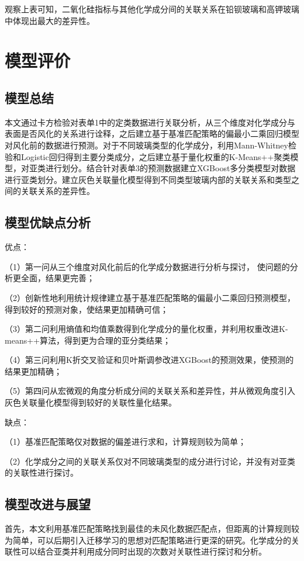\documentclass[withoutpreface,bwprint]{cumcmthesis} %
\begin{document}
观察上表可知，二氧化硅指标与其他化学成分间的关联关系在铅钡玻璃和高钾玻璃中体现出最大的差异性。

\section{模型评价}
\subsection{模型总结}

本文通过卡方检验对表单1中的定类数据进行关联分析，从三个维度对化学成分与表面是否风化的关系进行诠释，之后建立基于基准匹配策略的偏最小二乘回归模型对风化前的数据进行预测。对于不同玻璃类型的化学成分，利用Mann-Whitney检验和Logistic回归得到主要分类成分，之后建立基于量化权重的K-Means++聚类模型，对亚类进行划分。结合针对表单3的预测数据建立XGBoost多分类模型对数据进行亚类划分。建立灰色关联量化模型得到不同类型玻璃内部的关联关系和类型之间的关联关系的差异性。

\subsection{模型优缺点分析}
优点：

（1）第一问从三个维度对风化前后的化学成分数据进行分析与探讨， 使问题的分析更全面，结果更完善；

（2）创新性地利用统计规律建立基于基准匹配策略的偏最小二乘回归预测模型，得到较好的预测对象，使结果更加精确可信；

（3）第二问利用熵值和均值乘数得到化学成分的量化权重，并利用权重改进K-means++算法，得到更为合理的亚分类结果；

（4）第三问利用K折交叉验证和贝叶斯调参改进XGBoost的预测效果，使预测的结果更加精确；


（5）第四问从宏微观的角度分析成分间的关联关系和差异性，并从微观角度引入灰色关联量化模型得到较好的关联性量化结果。

缺点：

（1）基准匹配策略仅对数据的偏差进行求和，计算规则较为简单；

（2）化学成分之间的关联关系仅对不同玻璃类型的成分进行讨论，并没有对亚类的关联性进行探讨。

\subsection{模型改进与展望}
首先，本文利用基准匹配策略找到最佳的未风化数据匹配点，但距离的计算规则较为简单，可以后期引入迁移学习的思想对匹配策略进行更深的研究。化学成分的关联性可以结合亚类并利用成分同时出现的次数对关联性进行探讨和分析。
\end{document}
